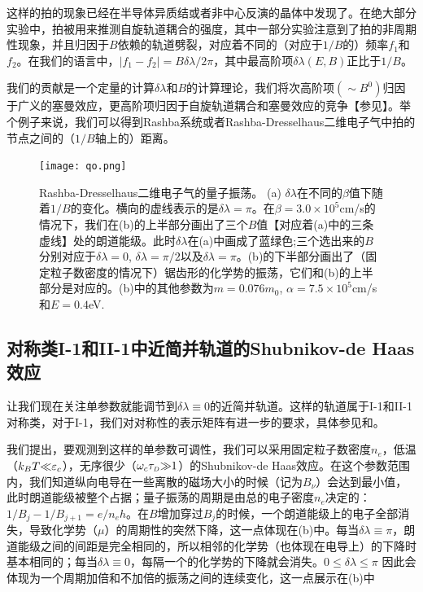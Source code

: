 这样的拍的现象已经在半导体异质结\cite{das_evidence_1989,hu_zero-field_1999,wilde_inversion-asymmetry-induced_2009}或者非中心反演的晶体\cite{terashima_fermi_2008,onuki_chiral-structure-driven_2014,maurya_splitting_2018}中发现了。在绝大部分实验中，拍被用来推测自旋轨道耦合的强度\cite{das_evidence_1989,onuki_chiral-structure-driven_2014,maurya_splitting_2018}，其中一部分实验\cite{das_evidence_1989}注意到了拍的非周期性现象，并且归因于$B$依赖的轨道劈裂，对应着不同的（对应于$1/B$的）频率$f_1$和$f_2$。在我们的语言中，$|f_1-f_2|=B\delta\lambda/2\pi$，其中最高阶项$\delta \lambda(E,B)$正比于$1/B$。

我们的贡献是一个定量的计算$\delta\lambda$和$B$的计算理论，我们将次高阶项$({\sim}B^0)$归因于广义的塞曼效应，更高阶项归因于自旋轨道耦合和塞曼效应的竞争【参见】。举个例子来说，我们可以得到Rashba系统或者Rashba-Dresselhaus二维电子气中拍的节点之间的（$1/B$轴上的）距离。


\begin{figure}
\texttt{[image: qo.png]}
\caption{Rashba-Dresselhaus二维电子气的量子振荡。 (a) $\delta\lambda$在不同的$\beta$值下随着$1/B$的变化。横向的虚线表示的是$\delta\lambda=\pi$。在$\beta=3.0\times 10^{5}$cm/s的情况下，我们在(b)的上半部分画出了三个$B$值【对应着(a)中的三条虚线】处的朗道能级。此时$\delta \lambda$在(a)中画成了蓝绿色;三个选出来的$B$分别对应于$\delta\lambda{=}0$, $\delta\lambda{=}\pi/2$以及$\delta\lambda{=}\pi$。(b)的下半部分画出了（固定粒子数密度的情况下）锯齿形的化学势的振荡，它们和(b)的上半部分是对应的。(b)中的其他参数为$m{=}0.076m_0$, $\alpha{=}7.5\times10^{5}$cm/s和$E=0.4$eV.
\label{fig:qo}}
\end{figure}

\subsection{对称类I-1和II-1中近简并轨道的Shubnikov-de Haas效应}\label{sec:quantosc_quasideg}

让我们现在关注单参数就能调节到$\delta \lambda{\equiv}0$的近简并轨道。这样的轨道属于I-1和II-1对称类，对于I-1，我们对对称性的表示矩阵有进一步的要求，具体参见和。

我们提出，要观测到这样的单参数可调性，我们可以采用固定粒子数密度$n_e$，低温（$k_BT{\ll}\varepsilon_c$），无序很少（$\omega_c\tau_{\scriptscriptstyle{D}}{\gg}1$）的Shubnikov-de Haas效应。在这个参数范围内，我们知道纵向电导在一些离散的磁场大小的时候（记为$B_{\nu}$）会达到最小值，此时朗道能级被整个占据\cite{vinter_resolution_1980}；量子振荡的周期是由总的电子密度$n_e$决定的：$1/B_j{-}1/B_{j+1}{=}e/n_eh$。在$B$增加穿过$B_j$的时候，一个朗道能级上的电子全部消失，导致化学势（$\mu$）的周期性的突然下降，这一点体现在(b)中。每当$\delta\lambda{\equiv}\pi$，朗道能级之间的间距是完全相同的，所以相邻的化学势（也体现在电导上）的下降时基本相同的；每当$\delta\lambda{\equiv}0$，每隔一个的化学势的下降就会消失\cite{bychkov_oscillatory_1984}。$0{\leq}\delta\lambda{\leq}{\pi}$ 因此会体现为一个周期加倍和不加倍的振荡之间的连续变化，这一点展示在(b)中

